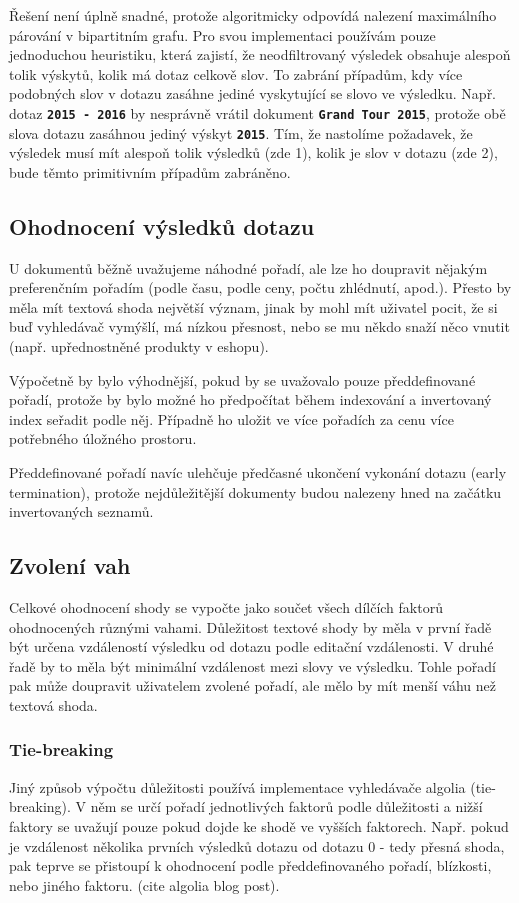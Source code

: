\documentclass[11pt,letterpaper,oneside,openright]{book}
\newcommand{\bftt}[1]{\texttt{\textbf{#1}}}
\begin{document}
Řešení není úplně snadné, protože algoritmicky odpovídá nalezení maximálního
párování v bipartitním grafu. Pro svou implementaci používám pouze jednoduchou
heuristiku, která zajistí, že neodfiltrovaný výsledek obsahuje alespoň tolik
výskytů, kolik má dotaz celkově slov. To zabrání případům, kdy více podobných
slov v dotazu zasáhne jediné vyskytující se slovo ve výsledku. Např. dotaz
\bftt{2015 - 2016} by nesprávně vrátil dokument \bftt{Grand Tour 2015}, protože
obě slova dotazu zasáhnou jediný výskyt \bftt{2015}. Tím, že nastolíme
požadavek, že výsledek musí mít alespoň tolik výsledků (zde 1), kolik je slov v
dotazu (zde 2), bude těmto primitivním případům zabráněno.



\subsection{Ohodnocení výsledků dotazu}
U dokumentů běžně uvažujeme náhodné pořadí, ale lze ho doupravit nějakým
preferenčním pořadím (podle času, podle ceny, počtu zhlédnutí, apod.). Přesto
by měla mít textová shoda největší význam, jinak by mohl mít uživatel pocit, že
si buď vyhledávač vymýšlí, má nízkou přesnost, nebo se mu někdo snaží něco
vnutit (např. upřednostněné produkty v eshopu).

Výpočetně by bylo výhodnější, pokud by se uvažovalo pouze předdefinované
pořadí, protože by bylo možné ho předpočítat během indexování a invertovaný
index seřadit podle něj. Případně ho uložit ve více pořadích za cenu více
potřebného úložného prostoru.

Předdefinované pořadí navíc ulehčuje předčasné ukončení vykonání dotazu (early
termination), protože nejdůležitější dokumenty budou nalezeny hned na začátku
invertovaných seznamů.

\subsection{Zvolení vah}
Celkové ohodnocení shody se vypočte jako součet všech dílčích faktorů
ohodnocených různými vahami. Důležitost textové shody by měla v první řadě být
určena vzdáleností výsledku od dotazu podle editační vzdálenosti. V druhé řadě
by to měla být minimální vzdálenost mezi slovy ve výsledku.  Tohle pořadí pak
může doupravit uživatelem zvolené pořadí, ale mělo by mít menší váhu než
textová shoda.

\subsubsection{Tie-breaking}
Jiný způsob výpočtu důležitosti používá implementace vyhledávače algolia
(tie-breaking). V něm se určí pořadí jednotlivých faktorů podle
důležitosti a nižší faktory se uvažují pouze pokud dojde ke shodě ve
vyšších faktorech. Např.  pokud je vzdálenost několika prvních výsledků
dotazu od dotazu 0 - tedy přesná shoda, pak teprve se přistoupí k
ohodnocení podle předdefinovaného pořadí, blízkosti, nebo jiného
faktoru. (cite algolia blog post).
\end{document}
